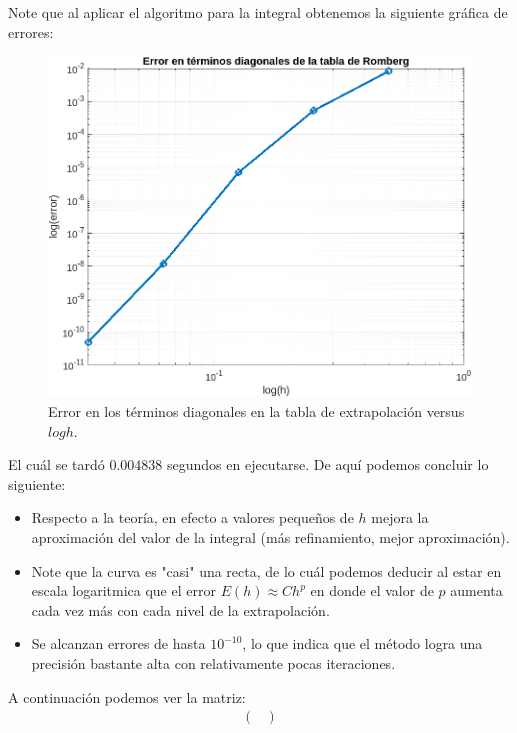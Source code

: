 \begin{homeworkProblem}
\begin{enumerate}
      \begin{solucion}
        Note que al aplicar el algoritmo para la integral obtenemos la siguiente gráfica de errores:
        \begin{figure}[H]
        \begin{center}
          \includegraphics[scale=0.7]{Figures/Romberg.png}
        \end{center}
        \caption{Error en los términos diagonales en la tabla de extrapolación versus $log h$.}
        \end{figure}
        El cuál se tardó $0.004838$ segundos en ejecutarse.
        \newpage
        De aquí podemos concluir lo siguiente:
        \begin{itemize}
          \item Respecto a la teoría, en efecto a valores pequeños de $h$ mejora la aproximación del valor de la integral (más refinamiento, mejor aproximación).
          \item Note que la curva es "casi" una recta, de lo cuál podemos deducir al estar en escala logaritmica que el error $E(h)\approx Ch^{p}$ en donde el valor de $p$ aumenta cada vez más con cada nivel de la extrapolación.
          \item Se alcanzan errores de hasta $10^{-10}$, lo que indica que el método logra una precisión bastante alta con relativamente pocas iteraciones.
        \end{itemize}
        A continuación podemos ver la matriz:
        \begin{align*}
          \begin{pmatrix}

\end{pmatrix}
\end{align*}
\end{solucion}
\end{enumerate}
\end{homeworkProblem}
